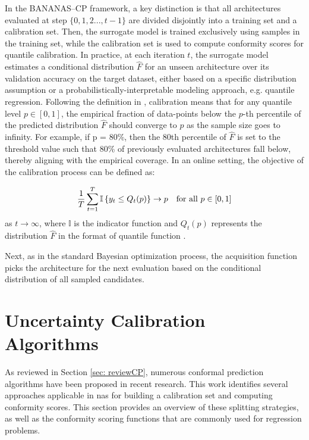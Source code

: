 {{In the BANANAS--CP framework, a key distinction is that all architectures evaluated at step $\{0, 1, 2..., t-1\}$ are divided disjointly into a training set and a calibration set. Then, the surrogate model is trained exclusively using samples in the training set, while the calibration set is used to compute conformity scores for quantile calibration. In practice, at each iteration $t$, the surrogate model estimates a conditional distribution $\hat{F}$ for an unseen architecture over its validation accuracy on the target dataset, either based on a specific distribution assumption or a probabilistically-interpretable modeling approach, e.g. quantile regression. Following the definition in \cite{deshpande2024online, pmlr-v80-kuleshov18a}, calibration means that for any quantile level $p\in [0, 1]$, the empirical fraction of data-points below the $p$-th percentile of the predicted distribution $\hat{F}$ should converge to $p$ as the sample size goes to infinity. For example, if p = 80\%, then the 80th percentile of $\hat{F}$ is set to the threshold value such that 80\% of previously evaluated architectures fall below, thereby aligning with the empirical coverage. In an online setting, the objective of the calibration process can be defined as:

\begin{equation}
\frac{1}{T} \sum_{t=1}^{T} \mathbb{I} \left\{ y_t \leq Q_t(p) \right\} \rightarrow p \quad \text{for all } p \in [0,1]
\vspace{1em}
\end{equation}
as $t \rightarrow \infty$, where $\mathbb{I}$ is the indicator function and $Q_t(p)$ represents the distribution $\hat{F}$ in the format of quantile function \cite{deshpande2024online, pmlr-v80-kuleshov18a}. 

Next, as in the standard  Bayesian optimization process, the acquisition function picks the architecture for the next evaluation based on the conditional distribution of all sampled candidates.

\section{Uncertainty Calibration Algorithms}
\label{sec:cp}
As reviewed in Section \ref{sec: reviewCP}, numerous conformal prediction algorithms have been proposed in recent research. This work identifies several approaches applicable in \gls{nas} for building a calibration set and computing conformity scores. This section provides an overview of these splitting strategies, as well as the conformity scoring functions that are commonly used for regression problems.

}}
